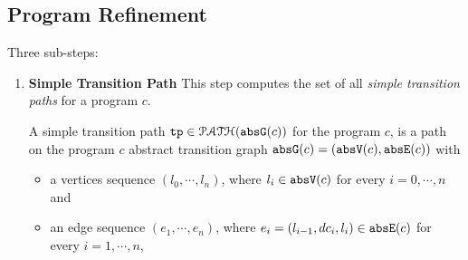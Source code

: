 \subsection{Program Refinement}
\label{sec:refine}
Three sub-steps:
\begin{enumerate}
\item \textbf{Simple Transition Path}  This step computes the set of all \emph{simple transition paths} for a program $c$.
\begin{defn}
  A simple transition path
  $\mathtt{tp} \in \mathcal{PATH}(\mathtt{abs}{\mathtt{G}}(c))$ for the program $c$, is a path on the program $c$ abstract transition graph $\mathtt{abs}{\mathtt{G}}(c) = (\mathtt{abs}{\mathtt{V}}(c), \mathtt{abs}{\mathtt{E}}(c))$ with 
  \begin{itemize}
  \item a vertices sequence $(l_0, \cdots, l_n)$, where $l_i \in \mathtt{abs}{\mathtt{V}}(c)$ for every $i = 0, \cdots, n$ and
  \item an edge sequence $(e_1, \cdots, e_n)$, where $e_i = (l_{i - 1}, dc_i, l_{i}) \in \mathtt{abs}{\mathtt{E}}(c)$ for every $i = 1, \cdots, n$,

\end{itemize}
\end{defn}
\end{enumerate}
